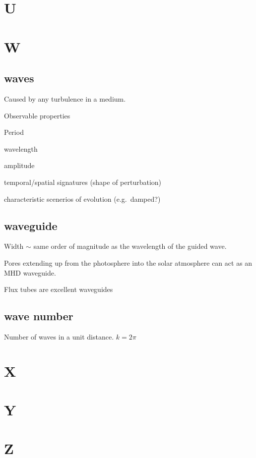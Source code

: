 \documentclass[12pt]{article}
\begin{document}
\section*{U}
\section*{W}

\subsection*{waves}
\begin{itemize*}
    \item Caused by any turbulence in a medium.
    \item Observable properties
        \begin{itemize*}
            \item Period
            \item wavelength
            \item amplitude
            \item temporal/spatial signatures (shape of perturbation)
            \item characteristic scenerios of evolution (e.g.\ damped?)
        \end{itemize*}
\end{itemize*}

\subsection*{waveguide}
\begin{itemize*}
    \item Width $\sim$ same order of magnitude as the wavelength of
        the guided wave.
    \item Pores extending up from the photosphere
        into the solar atmosphere can act as an
        MHD waveguide.
    \item Flux tubes are excellent waveguides
\end{itemize*}

\subsection*{wave number}
Number of waves in a unit distance.
$ k = 2\pi $

\section*{X}
\section*{Y}
\section*{Z}
\end{document}
